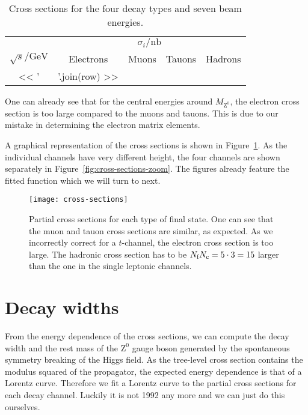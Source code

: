 \documentclass[11pt, english, fleqn, DIV=15, headinclude, BCOR=2cm]{scrreprt}
\newcommand\MZ{M_{\mathrm Z^0}}
\begin{document}
\begin{table}
    \centering
    \begin{tabular}{SSSSS}
        \toprule
        &  \\
        \cmidrule(l){2-5}
        {$\sqrt s / \si{\giga\electronvolt}$}
        & {Electrons}
        & {Muons}
        & {Tauons}
        & {Hadrons} \\
        \midrule
        << ' & '.join(row) >> \\
        \bottomrule
    \end{tabular}
    \caption{%
        Cross sections for the four decay types and seven beam energies.
    }
    \label{tab:cross-sections}
\end{table}

One can already see that for the central energies around $\MZ$, the electron
cross section is too large compared to the muons and tauons. This is due to our
mistake in determining the electron matrix elements.

A graphical representation of the cross sections is shown in
Figure~\ref{fig:cross-sections}. As the individual channels have very different
height, the four channels are shown separately in
Figure~\ref{fig:cross-sections-zoom}. The figures already feature the fitted
function which we will turn to next.

\begin{figure}
    \centering
    \texttt{[image: cross-sections]}
    \caption{%
        Partial cross sections for each type of final state. One can see that
        the muon and tauon cross sections are similar, as expected. As we
        incorrectly correct for a $t$-channel, the electron cross section is
        too large. The hadronic cross section has to be $N_\text f N_\text c =
        5 \cdot 3 = 15$ larger than the one in the single leptonic channels.
    }
    \label{fig:cross-sections}
\end{figure}



\section{Decay widths}

From the energy dependence of the cross sections, we can compute the decay
width and the rest mass of the $\mathrm Z^0$ gauge boson generated by the
spontaneous symmetry breaking of the Higgs field. As the tree-level cross
section contains the modulus squared of the propagator, the expected energy
dependence is that of a Lorentz curve. Therefore we fit a Lorentz curve to the
partial cross sections for each decay channel. Luckily it is not 1992 any more
and we can just do this ourselves.
\end{document}
